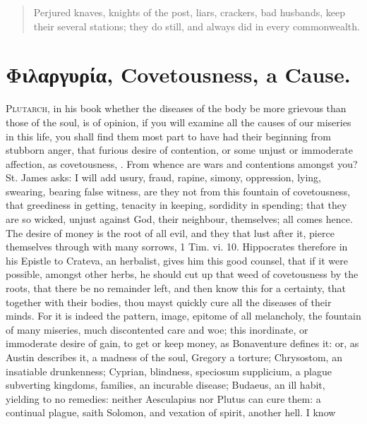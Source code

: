 {\begin{quote}
Perjured knaves, knights of the post, liars, crackers, bad husbands,
\etc{} keep their several stations; they do still, and always did in every
commonwealth.
\end{quote}

\section{\textgreek{Φιλαργυρία}, Covetousness, a Cause.}

\lettrine{P}{lutarch}, in his book whether the diseases of the body be more
grievous than those of the soul, is of opinion, if you will examine all
the causes of our miseries in this life, you shall find them most part
to have had their beginning from stubborn anger, that furious desire of
contention, or some unjust or immoderate affection, as covetousness,
\etc{}. From whence are wars and contentions amongst you? St. James
asks: I will add usury, fraud, rapine, simony, oppression, lying,
swearing, bearing false witness, \etc{} are they not from this fountain of
covetousness, that greediness in getting, tenacity in keeping,
sordidity in spending; that they are so wicked, unjust against
God, their neighbour, themselves; all comes hence. The desire of money
is the root of all evil, and they that lust after it, pierce themselves
through with many sorrows, 1 Tim. vi. 10. Hippocrates therefore in his
Epistle to Crateva, an herbalist, gives him this good counsel, that if
it were possible,  amongst other herbs, he should cut up that
weed of covetousness by the roots, that there be no remainder left, and
then know this for a certainty, that together with their bodies, thou
mayst quickly cure all the diseases of their minds. For it is indeed
the pattern, image, epitome of all melancholy, the fountain of many
miseries, much discontented care and woe; this inordinate, or
immoderate desire of gain, to get or keep money, as Bonaventure
defines it: or, as Austin describes it, a madness of the soul, Gregory
a torture; Chrysostom, an insatiable drunkenness; Cyprian, blindness,
speciosum supplicium, a plague subverting kingdoms, families, an
incurable disease; Budaeus, an ill habit, yielding to no
remedies: neither Aesculapius nor Plutus can cure them: a continual
plague, saith Solomon, and vexation of spirit, another hell. I know
}
